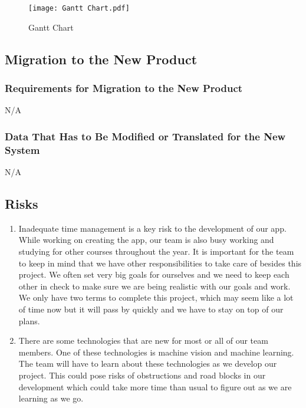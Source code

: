 \documentclass[12pt,letterpaper]{article}
\begin{document}
\newpage
\begin{landscape}
    \begin{figure}[ht]
    \begin{center}
        \caption{Gantt Chart}
        \texttt{[image: Gantt Chart.pdf]}
    \end{center}
\end{figure}
\end{landscape}


\newpage
\subsection{Migration to the New Product}

\subsubsection{Requirements for Migration to the New Product}
N/A

\subsubsection{Data That Has to Be Modified or Translated for the New System}
N/A

\subsection{Risks}
\begin{enumerate}
    \item Inadequate time management is a key risk to the development of our
    app. While working on creating the app, our team is also busy working and
    studying for other courses throughout the year. It is important for the team
    to keep in mind that we have other responsibilities to take care of besides
    this project. We often set very big goals for ourselves and we need to keep
    each other in check to make sure we are being realistic with our goals and
    work. We only have two terms to complete this project, which may seem like a
    lot of time now but it will pass by quickly and we have to stay on top of
    our plans.
    
    \item There are some technologies that are new for most or all of our team
    members. One of these technologies is machine vision and machine learning.
    The team will have to learn about these technologies as we develop our
    project. This could pose risks of obstructions and road blocks in our
    development which could take more time than usual to figure out as we are
    learning as we go.
\end{enumerate}
\end{document}
